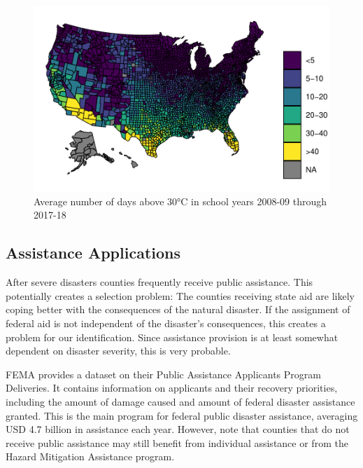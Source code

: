 \begin{figure}[!h]
	\centering
	\includegraphics[scale=1]{"../Code & Data/HeatMapDays.pdf"}
	\caption{Average number of days above 30°C in school years 2008-09 through 2017-18}
	\label{HeatMapDays}
\end{figure}


\subsection{Assistance Applications}

After severe disasters counties frequently receive public assistance. This potentially creates a selection problem: The counties receiving state aid are likely coping better with the consequences of the natural disaster. If the assignment of federal aid is not independent of the disaster's consequences, this creates a problem for our identification. Since assistance provision is at least somewhat dependent on disaster severity, this is very probable.

FEMA provides a dataset on  their Public Assistance Applicants Program Deliveries. It contains information on applicants and their recovery priorities, including the amount of damage caused and amount of federal disaster assistance granted. This is the main program for federal public disaster assistance, averaging USD 4.7 billion in assistance each year. However, note that counties that do not receive public assistance may still benefit from individual assistance or from the Hazard Mitigation Assistance program.

